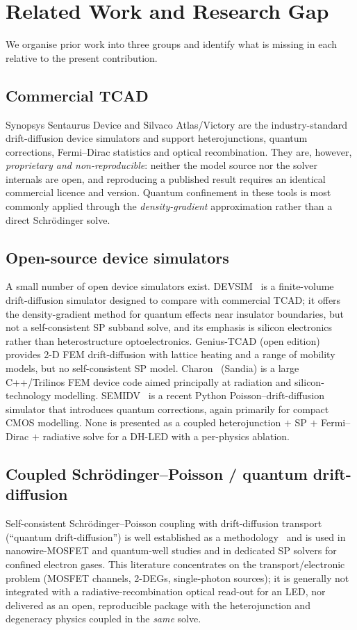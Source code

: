 \documentclass[conference]{IEEEtran}
\begin{document}
\section{Related Work and Research Gap}
We organise prior work into three groups and identify what is missing in each
relative to the present contribution.

\subsection{Commercial TCAD}
Synopsys Sentaurus Device and Silvaco Atlas/Victory are the industry-standard
drift-diffusion device simulators and support heterojunctions, quantum
corrections, Fermi--Dirac statistics and optical recombination. They are, however,
\emph{proprietary and non-reproducible}: neither the model source nor the solver
internals are open, and reproducing a published result requires an identical
commercial licence and version. Quantum confinement in these tools is most
commonly applied through the \emph{density-gradient} approximation rather than a
direct Schr\"odinger solve.

\subsection{Open-source device simulators}
A small number of open device simulators exist. DEVSIM~\cite{devsim} is a
finite-volume drift-diffusion simulator designed to compare with commercial TCAD;
it offers the density-gradient method for quantum effects near insulator
boundaries, but not a self-consistent SP subband solve, and its emphasis is
silicon electronics rather than heterostructure optoelectronics.
Genius-TCAD (open edition)~\cite{genius} provides 2-D FEM drift-diffusion with
lattice heating and a range of mobility models, but no self-consistent SP model.
Charon~\cite{charon} (Sandia) is a large C++/Trilinos FEM device code aimed
principally at radiation and silicon-technology modelling. SEMIDV~\cite{semidv}
is a recent Python Poisson--drift-diffusion simulator that introduces quantum
corrections, again primarily for compact CMOS modelling. None is presented as a
coupled heterojunction $+$ SP $+$ Fermi--Dirac $+$ radiative solve for a DH-LED
with a per-physics ablation.

\subsection{Coupled Schr\"odinger--Poisson / quantum drift-diffusion}
Self-consistent Schr\"odinger--Poisson coupling with drift-diffusion transport
(``quantum drift-diffusion'') is well established as a methodology~\cite{qdd} and
is used in nanowire-MOSFET and quantum-well studies and in dedicated SP solvers
for confined electron gases. This literature concentrates on the
transport/electronic problem (MOSFET channels, 2-DEGs, single-photon sources); it
is generally not integrated with a radiative-recombination optical read-out for an
LED, nor delivered as an open, reproducible package with the heterojunction and
degeneracy physics coupled in the \emph{same} solve.
\end{document}
